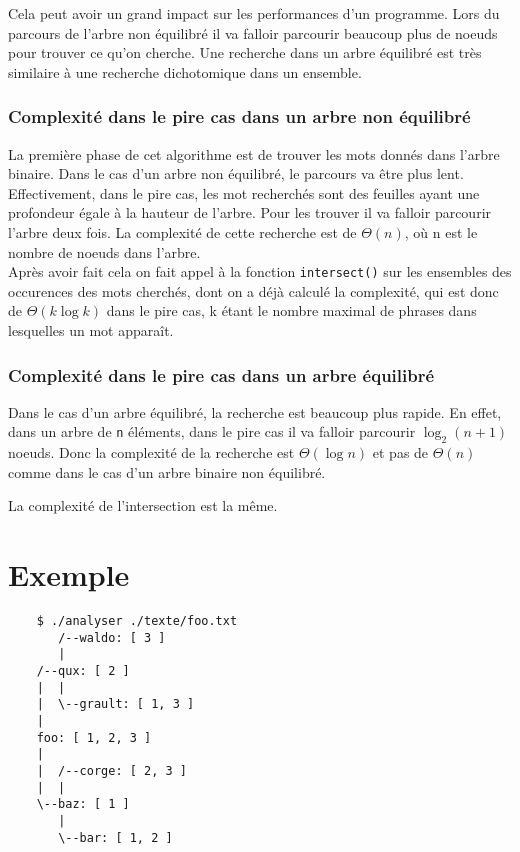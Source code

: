 \documentclass[11pt]{article}
\begin{document}
        Cela peut avoir un grand impact sur les performances d'un programme.
        Lors du parcours de l'arbre non équilibré il va falloir parcourir beaucoup
        plus de noeuds pour trouver ce qu'on cherche. Une recherche dans un arbre
        équilibré est très similaire à une recherche dichotomique dans un ensemble.


        \subsubsection{Complexité dans le pire cas dans un arbre non équilibré}
        La première phase de cet algorithme est de trouver les mots donnés dans
        l'arbre binaire. Dans le cas d'un arbre non équilibré, le parcours va être
        plus lent. Effectivement, dans le pire cas, les mot recherchés sont des
        feuilles ayant une profondeur égale à la hauteur de l'arbre. Pour les
        trouver il va falloir parcourir l'arbre deux fois. La complexité de
        cette recherche est de $\Theta(n)$, où n est le nombre de noeuds dans
        l'arbre.\\

        Après avoir fait cela on fait appel à la fonction \texttt{intersect()}
        sur les ensembles des occurences des mots cherchés, dont on a déjà
        calculé la complexité, qui est donc de $\Theta(k\log{}k)$ dans le pire cas,
        k étant le nombre maximal de phrases dans lesquelles un mot apparaît.

        \subsubsection{Complexité dans le pire cas dans un arbre équilibré}
        Dans le cas d'un arbre équilibré, la recherche est beaucoup plus rapide.
        En effet, dans un arbre de \texttt{n} éléments, dans le pire cas il va falloir
        parcourir ${\log_2(n+1)}$ noeuds. Donc la complexité de la recherche
        est $\Theta(\log{}n)$ et pas de $\Theta(n)$ comme dans le cas d'un arbre
        binaire non équilibré.

        La complexité de l'intersection est la même.


    \section{Exemple}

    \begin{verbatim}
    $ ./analyser ./texte/foo.txt
       /--waldo: [ 3 ]
       |
    /--qux: [ 2 ]
    |  |
    |  \--grault: [ 1, 3 ]
    |
    foo: [ 1, 2, 3 ]
    |
    |  /--corge: [ 2, 3 ]
    |  |
    \--baz: [ 1 ]
       |
       \--bar: [ 1, 2 ]
    \end{verbatim}
\end{document}
